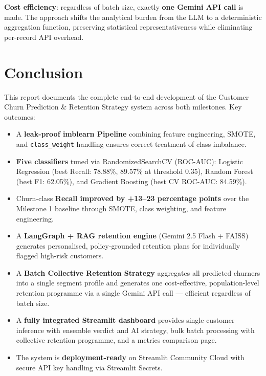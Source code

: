 \documentclass[12pt,a4paper]{article}
\begin{document}
\textbf{Cost efficiency}: regardless of batch size, exactly \textbf{one Gemini API call} is made. The approach shifts the analytical burden from the LLM to a deterministic aggregation function, preserving statistical representativeness while eliminating per-record API overhead.

\section*{Conclusion}

This report documents the complete end-to-end development of the Customer Churn Prediction \& Retention Strategy system across both milestones. Key outcomes:

\begin{itemize}[leftmargin=2em]
    \item A \textbf{leak-proof imblearn Pipeline} combining feature engineering, SMOTE, and \texttt{class\_weight} handling ensures correct treatment of class imbalance.
    \item \textbf{Five classifiers} tuned via RandomizedSearchCV (ROC-AUC): Logistic Regression (best Recall: 78.88\%, 89.57\% at threshold 0.35), Random Forest (best F1: 62.05\%), and Gradient Boosting (best CV ROC-AUC: 84.59\%).
    \item Churn-class \textbf{Recall improved by +13--23 percentage points} over the Milestone 1 baseline through SMOTE, class weighting, and feature engineering.
    \item A \textbf{LangGraph + RAG retention engine} (Gemini 2.5 Flash + FAISS) generates personalised, policy-grounded retention plans for individually flagged high-risk customers.
    \item A \textbf{Batch Collective Retention Strategy} aggregates all predicted churners into a single segment profile and generates one cost-effective, population-level retention programme via a single Gemini API call --- efficient regardless of batch size.
    \item A \textbf{fully integrated Streamlit dashboard} provides single-customer inference with ensemble verdict and AI strategy, bulk batch processing with collective retention programme, and a metrics comparison page.
    \item The system is \textbf{deployment-ready} on Streamlit Community Cloud with secure API key handling via Streamlit Secrets.
\end{itemize}
\end{document}
